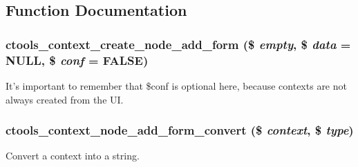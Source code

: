 \subsection{Function Documentation}
\hypertarget{node__add__form_8inc_a242e82f6988936da9573ed8f324bcf8c}{
\subsubsection[{ctools\_\-context\_\-create\_\-node\_\-add\_\-form}]{\setlength{\rightskip}{0pt plus 5cm}ctools\_\-context\_\-create\_\-node\_\-add\_\-form (\$ {\em empty}, \/  \$ {\em data} = {\ttfamily NULL}, \/  \$ {\em conf} = {\ttfamily FALSE})}}
\label{node__add__form_8inc_a242e82f6988936da9573ed8f324bcf8c}
It's important to remember that \$conf is optional here, because contexts are not always created from the UI. \hypertarget{node__add__form_8inc_afc396df3820b41516cf8cb374200f256}{
\subsubsection[{ctools\_\-context\_\-node\_\-add\_\-form\_\-convert}]{\setlength{\rightskip}{0pt plus 5cm}ctools\_\-context\_\-node\_\-add\_\-form\_\-convert (\$ {\em context}, \/  \$ {\em type})}}
\label{node__add__form_8inc_afc396df3820b41516cf8cb374200f256}
Convert a context into a string. 

